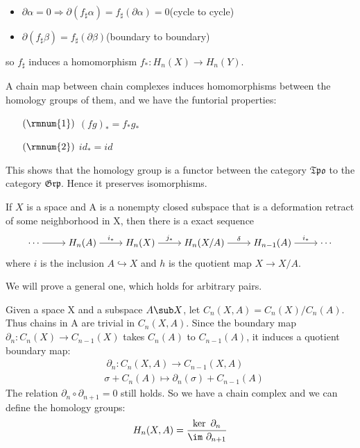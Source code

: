 \begin{itemize}
	\item $\partial\alpha=0\Rightarrow\partial(f_\sharp\alpha)=f_\sharp(\partial\alpha)=0$\quad (cycle to cycle)
	\item $\partial(f_\sharp\beta)=f_\sharp(\partial\beta)$\quad (boundary to boundary)
	
\end{itemize}
so $f_\sharp$ induces a homomorphism $f_*:H_n(X)\to H_n(Y)$.
\begin{proposition}
	A chain map between chain complexes induces homomorphisms between the homology groups of them, and we have the funtorial properties:
	\begin{itemize}
		\item[$(\rmnum{1})$] $(fg)_*=f_*g_*$ 
		\item[$(\rmnum{2})$] $id_*=id$
	\end{itemize}
	\end{proposition}
This shows that the homology group is a functor between the category $\mathfrak{Tpo}$ to the category $\mathfrak{Grp}$. Hence it preserves isomorphisms.
\vspace{5mm}
\begin{theorem}
	If $X$ is a space and A is a nonempty closed subspace that is a deformation retract of some neighborhood in X, then there is a exact sequence
\[
\begin{tikzcd}[cramped]
	\cdots \ar[r," "] &H_n(A)\ar[r,"i_*"] &H_n(X) \ar[r,"j_*"] &H_n(X/A) \ar[r,"\delta"] &H_{n-1}(A) \ar[r,"i_*"]&\cdots
\end{tikzcd}
\]
where $i$ is the inclusion $A\hookrightarrow X$ and $h$ is the quotient map $X\to X/A$.
\end{theorem}
We will prove a general one, which holds for arbitrary pairs.
\begin{definition}
Given a space X and a subspace $A\sub X$, let $C_n(X,A)=C_n(X)/C_n(A)$. Thus chains in A are trivial in $C_n(X,A)$. Since the boundary map $\partial_n: C_n(X)\to C_{n-1}(X)$ takes $C_n(A)$ to $C_{n-1}(A)$, it induces a quotient boundary map:
\begin{equation*}
\begin{split}
&\ \partial_n: C_n(X,A)\longrightarrow C_{n-1}(X,A)\\
&\sigma+C_n(A)\longmapsto \partial_n(\sigma)+C_{n-1}(A)
\end{split}
\end{equation*}
The relation $\partial_n\circ\partial_{n+1}=0$ still holds. So we have a chain complex and we can define the homology groups:
\[H_n(X,A)=\dfrac{\ker\ \partial_n}{\im\ \partial_{n+1}}\]
\end{definition}
